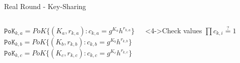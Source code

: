 \begin{frame}{Real Round - Key-Sharing}
\begin{columns}[c]
\begin{block}
                \centering
                \scriptsize$\mathtt{PoK}_{k,a} = PoK\{(K_a, r_{k,a}): c_{k,a} = g^{K_a} h^{r_{k,a}}\}$\\
                \scriptsize$\mathtt{PoK}_{k,b} = PoK\{(K_b, r_{k,b}): c_{k,b} = g^{K_b} h^{r_{k,b}}\}$\\
                \scriptsize$\mathtt{PoK}_{k,c} = PoK\{(K_c, r_{k,c}): c_{k,c} = g^{K_c} h^{r_{k,c}}\}$\\
            \end{block}
            \begin{exampleblock}<4->{Check values}
                \centering
                $\prod c_{k,i} \overset{?}{=} 1$
            \end{exampleblock}
    \end{columns}
\end{frame}